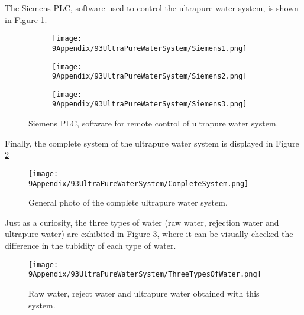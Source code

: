 The Siemens PLC, software used to control the ultrapure water system, is shown in Figure \ref{fig:Siemens}.

\begin{figure}
\centering
    \begin{subfigure}[b]{0.37\textwidth}
    \centering
    \texttt{[image: 9Appendix/93UltraPureWaterSystem/Siemens1.png]}  
    \caption{}
    \end{subfigure}
    \hfill
    \begin{subfigure}[b]{0.3\textwidth}
    \centering
    \texttt{[image: 9Appendix/93UltraPureWaterSystem/Siemens2.png]}  
    \caption{}
    \end{subfigure}
    \hfill
    \begin{subfigure}[b]{0.27\textwidth}
    \centering
    \texttt{[image: 9Appendix/93UltraPureWaterSystem/Siemens3.png]}  
    \caption{}
    \end{subfigure}
 \caption{Siemens PLC, software for remote control of ultrapure water system.}
 \label{fig:Siemens}
\end{figure}

Finally, the complete system of the ultrapure water system is displayed in Figure \ref{fig:CompleteSystem}

\begin{figure}[htbp]
\centering
\texttt{[image: 9Appendix/93UltraPureWaterSystem/CompleteSystem.png]}
\caption{General photo of the complete ultrapure water system.\label{fig:CompleteSystem}}
\end{figure}

Just as a curiosity, the three types of water (raw water, rejection water and ultrapure water) are exhibited in Figure \ref{fig:ThreeTypesOfWater}, where it can be visually checked the difference in the tubidity of each type of water.

\begin{figure}[htbp]
\centering
\texttt{[image: 9Appendix/93UltraPureWaterSystem/ThreeTypesOfWater.png]}
\caption{Raw water, reject water and ultrapure water obtained with this system.\label{fig:ThreeTypesOfWater}}
\end{figure}
